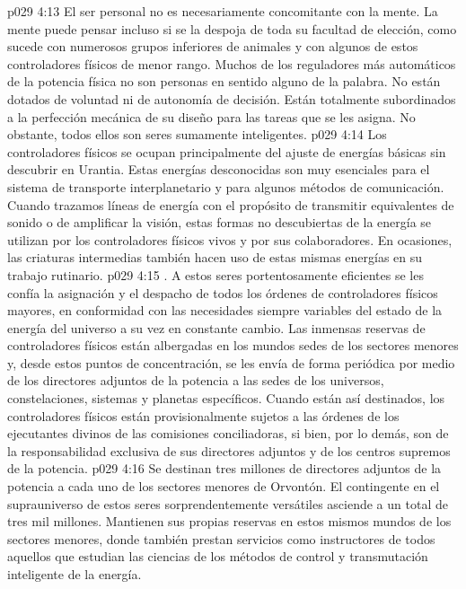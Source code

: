 \vs p029 4:13 El ser personal no es necesariamente concomitante con la mente. La mente puede pensar incluso si se la despoja de toda su facultad de elección, como sucede con numerosos grupos inferiores de animales y con algunos de estos controladores físicos de menor rango. Muchos de los reguladores más automáticos de la potencia física no son personas en sentido alguno de la palabra. No están dotados de voluntad ni de autonomía de decisión. Están totalmente subordinados a la perfección mecánica de su diseño para las tareas que se les asigna. No obstante, todos ellos son seres sumamente inteligentes.
\vs p029 4:14 Los controladores físicos se ocupan principalmente del ajuste de energías básicas sin descubrir en Urantia. Estas energías desconocidas son muy esenciales para el sistema de transporte interplanetario y para algunos métodos de comunicación. Cuando trazamos líneas de energía con el propósito de transmitir equivalentes de sonido o de amplificar la visión, estas formas no descubiertas de la energía se utilizan por los controladores físicos vivos y por sus colaboradores. En ocasiones, las criaturas intermedias también hacen uso de estas mismas energías en su trabajo rutinario.
\vs p029 4:15 . A estos seres portentosamente eficientes se les confía la asignación y el despacho de todos los órdenes de controladores físicos mayores, en conformidad con las necesidades siempre variables del estado de la energía del universo a su vez en constante cambio. Las inmensas reservas de controladores físicos están albergadas en los mundos sedes de los sectores menores y, desde estos puntos de concentración, se les envía de forma periódica por medio de los directores adjuntos de la potencia a las sedes de los universos, constelaciones, sistemas y planetas específicos. Cuando están así destinados, los controladores físicos están provisionalmente sujetos a las órdenes de los ejecutantes divinos de las comisiones conciliadoras, si bien, por lo demás, son de la responsabilidad exclusiva de sus directores adjuntos y de los centros supremos de la potencia.
\vs p029 4:16 Se destinan tres millones de directores adjuntos de la potencia a cada uno de los sectores menores de Orvontón. El contingente en el suprauniverso de estos seres sorprendentemente versátiles asciende a un total de tres mil millones. Mantienen sus propias reservas en estos mismos mundos de los sectores menores, donde también prestan servicios como instructores de todos aquellos que estudian las ciencias de los métodos de control y transmutación inteligente de la energía.
